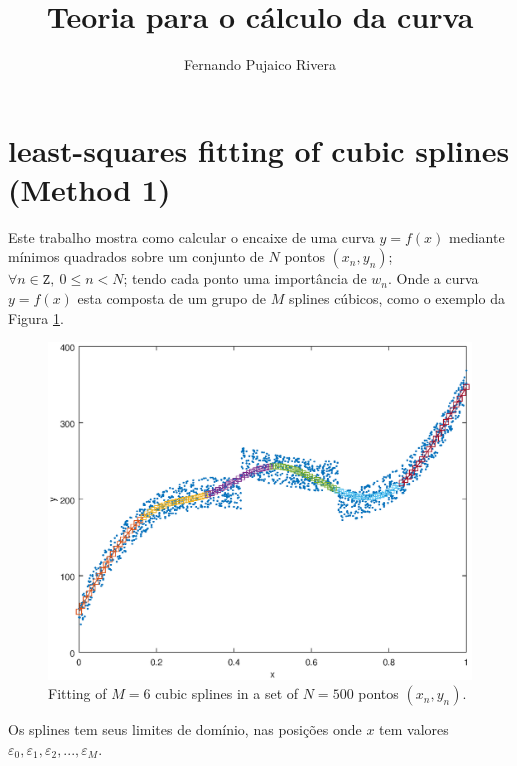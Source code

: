 \documentclass[a4paper,10pt]{article}
\title{Teoria para o cálculo da curva}
\author{Fernando Pujaico Rivera}
\begin{document}
\maketitle

\begin{abstract}

\end{abstract}

\section{least-squares fitting of cubic splines (Method 1)}
\label{sec:spline3method1}

Este trabalho mostra como calcular o encaixe de uma curva $y=f(x)$ 
mediante mínimos quadrados sobre um conjunto de $N$ pontos $(x_n,y_n)$; 
$\forall n \in \mathtt{Z},~0\leq n < N$; tendo
cada ponto uma importância de $w_n$.
Onde a curva 
$y=f(x)$ esta composta de um grupo de $M$ splines cúbicos, 
como o exemplo da Figura \ref{fig:leastmeanspline3}.
\begin{figure}[!htb]
\centering
\includegraphics[scale=0.33]{splines3demo.eps}
\caption{Fitting of $M=6$ cubic splines in a set of $N=500$ pontos $(x_n,y_n)$.}
\label{fig:leastmeanspline3}
\end{figure}

Os splines tem seus limites de domínio, nas posições onde $x$ tem valores 
$\varepsilon_{0}, \varepsilon_{1}, \varepsilon_{2}, ..., \varepsilon_{M}$. 
\end{document}
